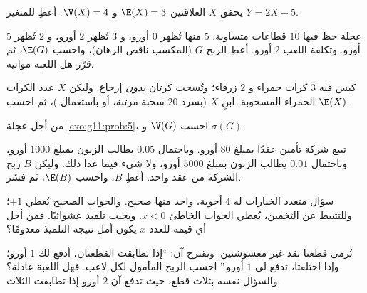 \begin{exercise}[$\star$]\label{exo:g11:prob:4}
يحقق $X$ العلاقتين $\E(X) = 3$ و $\V(X) = 4$. أعطِ  
 للمتغير $Y = 2X - 5$.
\end{exercise}

\begin{exercise}[$\star\star$]\label{exo:g11:prob:5}
عجلة حظ فيها $10$ قطاعات متساوية: $5$ منها تُظهر $0$ أورو، و $3$ تُظهر
$2$ أورو، و $2$ تُظهر $5$ أورو. وتكلفة اللعب $2$ أورو. أعطِ
 الربح $G$ (المكسب ناقص الرهان)، واحسب $\E(G)$، ثم
قرّر هل اللعبة مواتية.
\end{exercise}

\begin{exercise}[$\star\star$]\label{exo:g11:prob:6}
كيس فيه $3$ كرات حمراء و $2$ زرقاء؛ وتُسحب كرتان
\emph{بدون} إرجاع. وليكن $X$ عدد الكرات الحمراء المسحوبة.
ابنِ  $X$ (بسرد $20$ سحبة مرتبة، أو باستعمال
)، ثم احسب $\E(X)$.
\end{exercise}

\begin{exercise}[$\star\star$]\label{exo:g11:prob:7}
من أجل عجلة \cref{exo:g11:prob:5}، احسب $\V(G)$ و $\sigma(G)$.
\end{exercise}

\begin{exercise}[$\star\star$]\label{exo:g11:prob:8}
تبيع شركة تأمين عقدًا بمبلغ $80$ أورو. وباحتمال
$0.05$ يطالب الزبون بمبلغ $1000$ أورو، وباحتمال $0.01$ يطالب الزبون
بمبلغ $5000$ أورو، ولا شيء فيما عدا ذلك. وليكن $B$ ربح الشركة
من عقد واحد. أعطِ  $B$، واحسب $\E(B)$، ثم
فسّر.
\end{exercise}

\begin{exercise}[$\star\star$]\label{exo:g11:prob:9}
سؤال متعدد الخيارات له $4$ أجوبة، واحد منها صحيح. والجواب الصحيح
يُعطي $+1$؛ وللتثبيط عن التخمين، يُعطي الجواب الخاطئ $x < 0$.
ويجيب تلميذ عشوائيًا. فمن أجل أي قيمة للعدد $x$ يكون
أمل نتيجة التلميذ معدومًا؟
\end{exercise}

\begin{exercise}[$\star\star$]\label{exo:g11:prob:10}
تُرمى قطعتا نقد غير مغشوشتين. وتقترح آن: ``إذا تطابقت القطعتان، أدفع لك
$1$ أورو؛ وإذا اختلفتا، تدفع لي $1$ أورو.'' احسب الربح المأمول
لكل لاعب. فهل اللعبة عادلة؟ والسؤال نفسه بثلاث قطع،
حيث تدفع آن $2$ أورو إذا تطابقت الثلاث.
\end{exercise}

